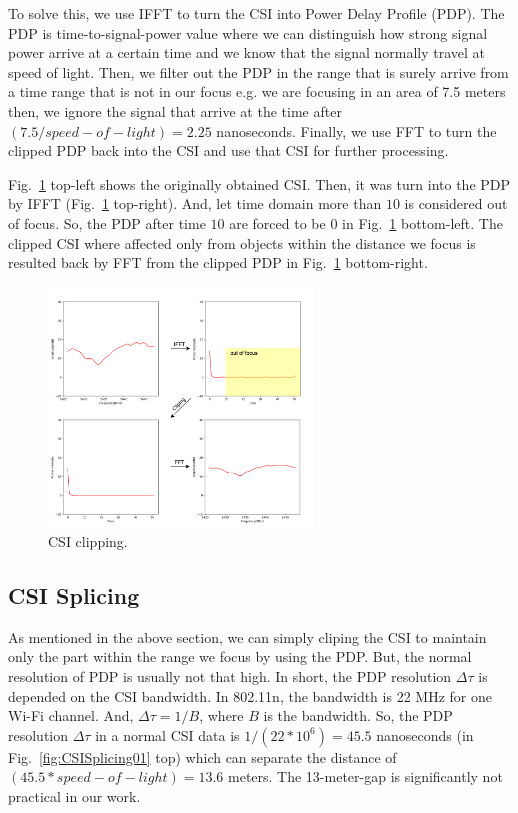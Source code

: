 \documentclass[conference]{IEEEtran}
\begin{document}
	 To solve this, we use IFFT to turn the CSI into Power Delay Profile (PDP). The PDP is time-to-signal-power value where we can distinguish how strong signal power arrive at a certain time and we know that the signal normally travel at speed of light. Then, we filter out the PDP in the range that is surely arrive from a time range that is not in our focus e.g. we are focusing in an area of 7.5 meters then, we ignore the signal that arrive at the time after $(7.5/speed-of-light)= 2.25$ nanoseconds. Finally, we use FFT to turn the clipped PDP back into the CSI and use that CSI for further processing.
	 
	  Fig.~\ref{fig:CSIClipping01} top-left shows the originally obtained CSI. Then, it was turn into the PDP by IFFT (Fig.~\ref{fig:CSIClipping01} top-right). And, let time domain more than $10$ is considered out of focus. So, the PDP after time $10$ are forced to be $0$ in Fig.~\ref{fig:CSIClipping01} bottom-left. The clipped CSI where affected only from objects within the distance we focus is resulted back by FFT from the clipped PDP in Fig.~\ref{fig:CSIClipping01} bottom-right.
	 
	 \begin{figure}[htbp]

	 	\centerline{\includegraphics[width=70mm,scale=0.5]{CSIClipping01.png}}
	 	\caption{CSI clipping.}
	 	\label{fig:CSIClipping01}
	 \end{figure}
	 
	 \subsection{CSI Splicing}
	
	As mentioned in the above section, we can simply cliping the CSI to maintain only the part within the range we focus by using the PDP. But, the normal resolution of PDP is usually not that high. In short, the PDP resolution $\Delta\tau$ is depended on the CSI bandwidth. In 802.11n, the bandwidth is 22 MHz for one Wi-Fi channel. And, $\Delta\tau = 1/B$, where $B$ is the bandwidth.
	So, the PDP resolution $\Delta\tau$ in a normal CSI data is $1/(22*10^6)= 45.5$ nanoseconds (in Fig.~\ref{fig:CSISplicing01} top) which can separate the distance of
	$(45.5*speed-of-light)= 13.6$ meters. The 13-meter-gap is significantly not practical in our work.
	
\end{document}
